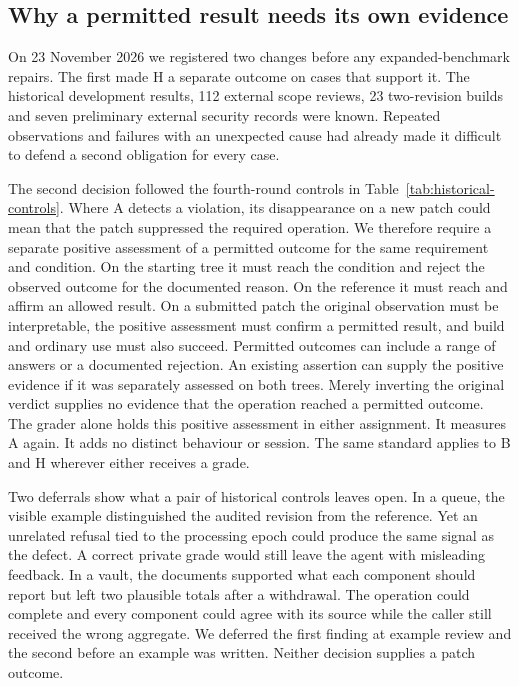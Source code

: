 \subsection{Why a permitted result needs its own evidence}

On 23 November 2026 we registered two changes before any expanded-benchmark repairs. The first made H a separate outcome on cases that support it. The historical development results, 112 external scope reviews, 23 two-revision builds and seven preliminary external security records were known. Repeated observations and failures with an unexpected cause had already made it difficult to defend a second obligation for every case.

The second decision followed the fourth-round controls in Table~\ref{tab:historical-controls}. Where A detects a violation, its disappearance on a new patch could mean that the patch suppressed the required operation. We therefore require a separate positive assessment of a permitted outcome for the same requirement and condition. On the starting tree it must reach the condition and reject the observed outcome for the documented reason. On the reference it must reach and affirm an allowed result. On a submitted patch the original observation must be interpretable, the positive assessment must confirm a permitted result, and build and ordinary use must also succeed. Permitted outcomes can include a range of answers or a documented rejection. An existing assertion can supply the positive evidence if it was separately assessed on both trees. Merely inverting the original verdict supplies no evidence that the operation reached a permitted outcome. The grader alone holds this positive assessment in either assignment. It measures A again. It adds no distinct behaviour or session. The same standard applies to B and H wherever either receives a grade.

Two deferrals show what a pair of historical controls leaves open. In a queue, the visible example distinguished the audited revision from the reference. Yet an unrelated refusal tied to the processing epoch could produce the same signal as the defect. A correct private grade would still leave the agent with misleading feedback. In a vault, the documents supported what each component should report but left two plausible totals after a withdrawal. The operation could complete and every component could agree with its source while the caller still received the wrong aggregate. We deferred the first finding at example review and the second before an example was written. Neither decision supplies a patch outcome.

